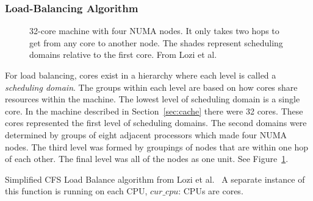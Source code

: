 \documentclass{sig-alternate}
\begin{document}
\subsubsection{Load-Balancing Algorithm}
\label{sec:loadbalancealg}

\begin{figure}
\centering
{}
\caption{32-core machine with four NUMA nodes. It only takes two hops to get from any core to another node. The shades represent scheduling domains relative to the first core. From Lozi et al.~\cite{Lozi:2016}}
\label{fig:domains}
\end{figure}


For load balancing, cores exist in a hierarchy where each level is called a \emph{scheduling domain}. The groups within each level are based on how cores share resources within the machine. The lowest level of scheduling domain is a single core. In the machine described in Section~\ref{sec:cache} there were 32 cores. These cores represented the first level of scheduling domains. The second domains were determined by groups of eight adjacent processors which made four NUMA nodes. The third level was formed by groupings of nodes that are within one hop of each other. The final level was all of the nodes as one unit. See Figure~\ref{fig:domains}.~\cite{Lozi:2016}


{\SetAlgoNoLine%
	\DontPrintSemicolon 
\begin{algorithm}
\Frog\;
\label{fig:cfsloadbalancer}	
\caption{Simplified CFS Load Balance algorithm from Lozi et al.~\cite{Lozi:2016} A separate instance of this function is running on each CPU, $\textit{cur\_cpu:}$ CPUs are cores.}
\end{algorithm}
}
\end{document}

